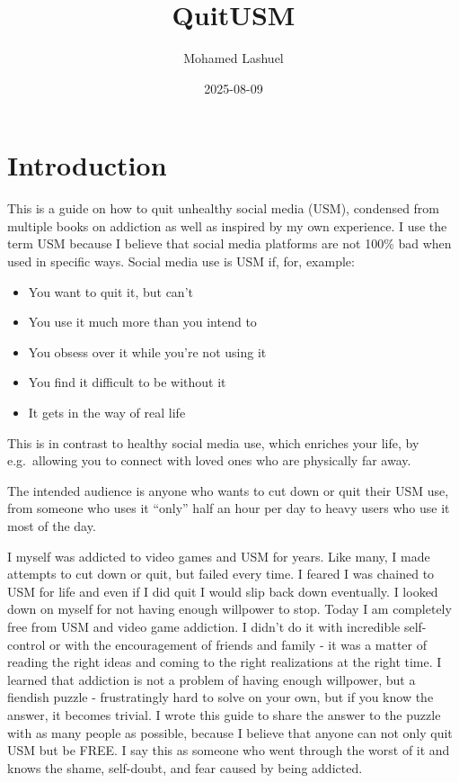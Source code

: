 \documentclass[
  openany]{book}
\title{QuitUSM}
\author{Mohamed Lashuel}
\date{2025-08-09}
\providecommand{\tightlist}{%
  \setlength{\itemsep}{0pt}\setlength{\parskip}{0pt}}
\begin{document}
\maketitle

{
\setcounter{tocdepth}{1}
\tableofcontents
}
\chapter{Introduction}\label{introduction}

This is a guide on how to quit unhealthy social media (USM), condensed from multiple books on addiction as well as inspired by my own experience. I use the term USM because I believe that social media platforms are not 100\% bad when used in specific ways. Social media use is USM if, for, example:

\begin{itemize}
\tightlist
\item
  You want to quit it, but can't
\item
  You use it much more than you intend to
\item
  You obsess over it while you're not using it
\item
  You find it difficult to be without it
\item
  It gets in the way of real life
\end{itemize}

This is in contrast to healthy social media use, which enriches your life, by e.g.~allowing you to connect with loved ones who are physically far away.

The intended audience is anyone who wants to cut down or quit their USM use, from someone who uses it ``only'' half an hour per day to heavy users who use it most of the day.

I myself was addicted to video games and USM for years. Like many, I made attempts to cut down or quit, but failed every time. I feared I was chained to USM for life and even if I did quit I would slip back down eventually. I looked down on myself for not having enough willpower to stop. Today I am completely free from USM and video game addiction. I didn't do it with incredible self-control or with the encouragement of friends and family - it was a matter of reading the right ideas and coming to the right realizations at the right time. I learned that addiction is not a problem of having enough willpower, but a fiendish puzzle - frustratingly hard to solve on your own, but if you know the answer, it becomes trivial. I wrote this guide to share the answer to the puzzle with as many people as possible, because I believe that anyone can not only quit USM but be FREE. I say this as someone who went through the worst of it and knows the shame, self-doubt, and fear caused by being addicted.
\end{document}
